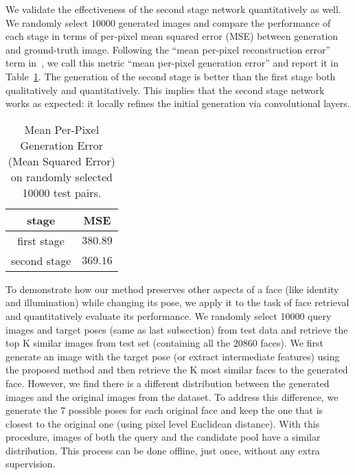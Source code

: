 \documentclass[10pt,twocolumn,letterpaper]{article}
\begin{document}
We validate the effectiveness of the second stage network quantitatively as well. We randomly select $10000$ generated images and compare the performance of each stage in terms of per-pixel mean squared error (MSE) between generation and ground-truth image. Following the ``mean per-pixel reconstruction error'' term in~\cite{turmukhambetov2015modeling}, we call this metric ``mean per-pixel generation error'' and report it in Table~\ref{table:2stage_MSE_performance}. %
The generation of the second stage is better than the first stage both qualitatively and quantitatively.
This implies that the second stage network works as expected: it locally refines the initial generation via convolutional layers.

\begin{table}
\begin{center}{\small
{
\begin{tabular}{|c|c|}
\hline
stage & MSE \\
\hline\hline
{first stage}	&	$380.89$ \\
{second stage}	&	$369.16$ \\
\hline
\end{tabular}
}
}
\end{center}
\caption{Mean Per-Pixel Generation Error (Mean Squared Error) on randomly selected 10000 test pairs.}
\label{table:2stage_MSE_performance}
\end{table}%
To demonstrate how our method preserves other aspects of a face (like identity and illumination) while changing its pose, we apply it to the task of face retrieval and quantitatively evaluate its performance.
We randomly select 10000 query images and target poses (same as last subsection) from test data and retrieve the top K similar images from test set (containing all the $20860$ faces).
We first generate an image with the target pose (or extract intermediate features) using the proposed method and then retrieve the K most similar faces to the generated face. However, we find there is a different distribution between the generated images and the original images from the dataset. To address this difference, we generate the 7 possible poses for each original face and keep the one that is closest to the original one (using pixel level Euclidean distance). With this procedure, images of both the query and the candidate pool have a similar distribution. This process can be done offline, just once, without any extra supervision.
\end{document}
